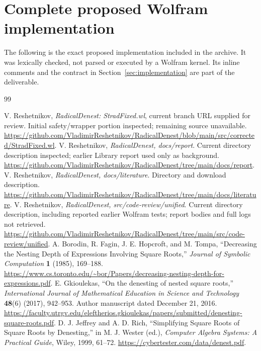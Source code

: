 \documentclass[11pt,letterpaper]{article}
\numberwithin{equation}{section}
\theoremstyle{definition}\newtheorem{definition}[theorem]{Definition}
\theoremstyle{remark}\newtheorem{remark}[theorem]{Remark}
\begin{document}
\section{Complete proposed Wolfram implementation}
The following is the exact proposed implementation included in the archive. It was lexically checked, not parsed or executed by a Wolfram kernel. Its inline comments and the contract in Section~\ref{sec:implementation} are part of the deliverable.


\clearpage
\begin{thebibliography}{99}
 V. Reshetnikov, \emph{RadicalDenest: StradFixed.wl}, current branch URL supplied for review. Initial safety/wrapper portion inspected; remaining source unavailable. \url{https://github.com/VladimirReshetnikov/RadicalDenest/blob/main/src/corrected/StradFixed.wl}.
 V. Reshetnikov, \emph{RadicalDenest, docs/report}. Current directory description inspected; earlier Library report used only as background. \url{https://github.com/VladimirReshetnikov/RadicalDenest/tree/main/docs/report}.
 V. Reshetnikov, \emph{RadicalDenest, docs/literature}. Directory and download description. \url{https://github.com/VladimirReshetnikov/RadicalDenest/tree/main/docs/literature}.
 V. Reshetnikov, \emph{RadicalDenest, src/code-review/unified}. Current directory description, including reported earlier Wolfram tests; report bodies and full logs not retrieved. \url{https://github.com/VladimirReshetnikov/RadicalDenest/tree/main/src/code-review/unified}.
 A. Borodin, R. Fagin, J. E. Hopcroft, and M. Tompa, ``Decreasing the Nesting Depth of Expressions Involving Square Roots,'' \emph{Journal of Symbolic Computation} \textbf{1} (1985), 169--188. \url{https://www.cs.toronto.edu/~bor/Papers/decreasing-nesting-depth-for-expressions.pdf}.
 E. Gkioulekas, ``On the denesting of nested square roots,'' \emph{International Journal of Mathematical Education in Science and Technology} \textbf{48}(6) (2017), 942--953. Author manuscript dated December 21, 2016. \url{https://faculty.utrgv.edu/eleftherios.gkioulekas/papers/submitted/denesting-square-roots.pdf}.
 D. J. Jeffrey and A. D. Rich, ``Simplifying Square Roots of Square Roots by Denesting,'' in M. J. Wester (ed.), \emph{Computer Algebra Systems: A Practical Guide}, Wiley, 1999, 61--72. \url{https://cybertester.com/data/denest.pdf}.

\end{thebibliography}
\end{document}
